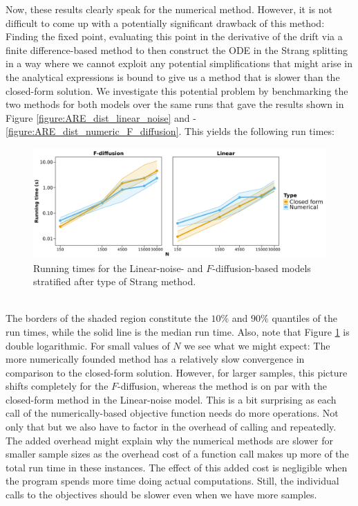 Now, these results clearly speak for the numerical method. However, it is not difficult to come up with a potentially significant drawback of this method: Finding the fixed point, evaluating this point in the derivative of the drift via a finite difference-based method to then construct the ODE in the Strang splitting in a way where we cannot exploit any potential simplifications that might arise in the analytical expressions is bound to give us a method that is slower than the closed-form solution. We investigate this potential problem by benchmarking the two methods for both models over the same runs that gave the results shown in Figure \ref{figure:ARE_dist_linear_noise} and - \ref{figure:ARE_dist_numeric_F_diffusion}. This yields the following run times:
\begin{figure}[h!]
    \begin{center}
    \includegraphics[scale = .09]{figures/Running_result_numeric.jpeg}
    \caption{Running times for the Linear-noise- and $F$-diffusion-based models stratified after type of Strang method.} 
    \label{figure:running_result_numeric}       
    \end{center}
\end{figure}\\
The borders of the shaded region constitute the $10\%$ and $90\%$ quantiles of the run times, while the solid line is the median run time. Also, note that Figure \ref{figure:running_result_numeric} is double logarithmic. For small values of $N$ we see what we might expect: The more numerically founded method has a relatively slow convergence in comparison to the closed-form solution. However, for larger samples, this picture shifts completely for the $F$-diffusion, whereas the method is on par with the closed-form method in the Linear-noise model. This is a bit surprising as each call of the numerically-based objective function needs do more operations. Not only that but we also have to factor in the overhead of calling  and  repeatedly. The added overhead might explain why the numerical methods are slower for smaller sample sizes as the overhead cost of a function call makes up more of the total run time in these instances. The effect of this added cost is negligible when the program spends more time doing actual computations. Still, the individual calls to the objectives should be slower even when we have more samples. \\\\

